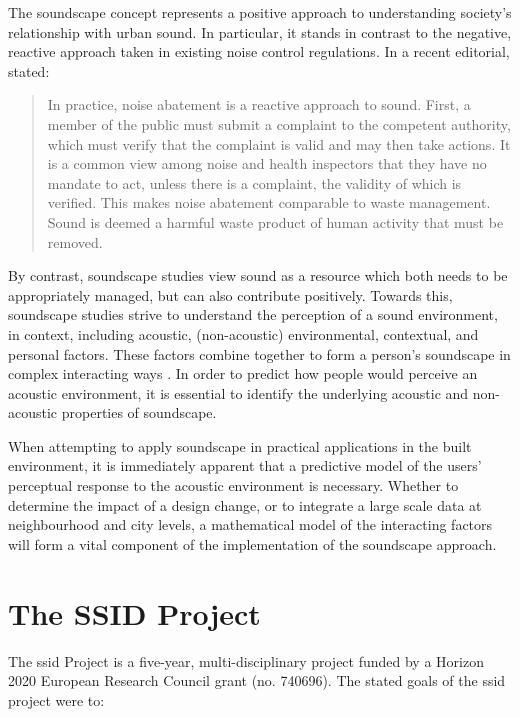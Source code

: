 The soundscape concept represents a positive approach to understanding society's relationship with urban sound. In particular, it stands in contrast to the negative, reactive approach taken in existing noise control regulations. In a recent editorial, \citet{Axelsson2020Soundscape} stated:

\begin{quote}
  In practice, noise abatement is a reactive approach to sound. First, a member of the public must submit a complaint to the competent authority, which must verify that the complaint is valid and may then take actions. It is a common view among noise and health inspectors that they have no mandate to act, unless there is a complaint, the validity of which is verified. This makes noise abatement comparable to waste management. Sound is deemed a harmful waste product of human activity that must be removed.
\end{quote}

By contrast, soundscape studies view sound as a resource which both needs to be appropriately managed, but can also contribute positively. Towards this, soundscape studies strive to understand the perception of a sound environment, in context, including acoustic, (non-acoustic) environmental, contextual, and personal factors. These factors combine together to form a person's soundscape in complex interacting ways \citep{Berglund2006Tool}. In order to predict how people would perceive an acoustic environment, it is essential to identify the underlying acoustic and non-acoustic properties of soundscape.

When attempting to apply soundscape in practical applications in the built environment, it is immediately apparent that a predictive model of the users' perceptual response to the acoustic environment is necessary. Whether to determine the impact of a design change, or to integrate a large scale data at neighbourhood and city levels, a mathematical model of the interacting factors will form a vital component of the implementation of the soundscape approach. 


\section{The SSID Project}
The \gls{ssid} Project is a five-year, multi-disciplinary project funded by a Horizon 2020 European Research Council grant (no. 740696). The stated goals of the \gls{ssid} project  were to:

